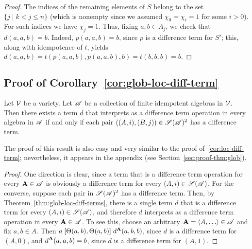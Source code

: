 \begin{proof}
The indices of the remaining elements of $S$
belong to the set $\{j \mid k<j\leq n\}$ (which is nonempty since we
assumed $\chi_0 = \chi_i = 1$ for some $i>0$).
For such indices we have $\chi_j = 1$.
Thus, fixing $a, b \in A_j$, we check that $d(a,a,b) = b$.
Indeed, $p(a,a,b) = b$, since $p$ is a \glocal difference term for $S'$; 
this, along with idempotence of $t$, yields
$d(a,a,b) =t(p(a,a,b), p(a,a,b), b)=t(b, b, b) =b$.
\end{proof}

\subsection{Proof of Corollary~\ref{cor:glob-loc-diff-term}}
\label{sec:proof-cor:glob}
\begin{corollary}[\ref{cor:glob-loc-diff-term}]
  Let $\mathcal{V}$ be a variety.  Let $\mathscr{A}$ be a collection of finite idempotent
  algebras in $\mathcal{V}$. %
  Then there exists a term $d$ that interprets as a difference term operation
  in every algebra in $\mathscr{A}$
  if and only if each pair $((A,i), (B,j)) \in \mathscr{S}(\mathscr{A})^2$ has a \glocal
  difference term.
\end{corollary}
The proof of this result is also easy and very similar to the proof
of~\ref{cor:loc-diff-term}; nevertheless, it appears in the appendix
(see Section~\ref{sec:proof-thm:glob}).
\begin{proof}
  One direction is clear, since a term that is a difference term operation for
  every $\mathbf{A} \in \mathscr{A}$ is obviously a \glocal difference term for
  every $(A, i) \in \mathscr{S}(\mathscr{A})$.
  For the converse, suppose
  each pair in $\mathscr{S}(\mathscr{A})^2$ has a \glocal
  difference term. Then, by Theorem~\ref{thm:glob-loc-diff-terms},
  there is a single term $d$ that is a \glocal difference term for every 
  $(A, i) \in \mathscr{S}(\mathscr{A})$, 
  and therefore $d$ interprets as a difference term operation in every $\mathbf{A} \in \mathscr{A}$.
  To see this, choose an arbitrary $\bA = \<A, \dots\> \in \scA$ and fix $a, b \in A$. 
  Then $a \mathrel{[\Theta(a,b), \Theta(a,b)]} d^{\mathbf{A}}(a,b,b)$,
  since $d$ is a \glocal difference term for $(A,0)$,
  and $d^{\mathbf{A}}(a,a,b) = b$, since $d$ is a \glocal
  difference term for $(A,1)$. 
\end{proof}






